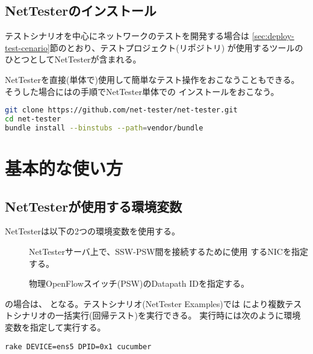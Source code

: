   \subsection{NetTesterのインストール}

テストシナリオを中心にネットワークのテストを開発する場合は
\ref{sec:deploy-test-cenario}節のとおり、テストプロジェクト(リポジトリ)
が使用するツールのひとつとしてNetTesterが含まれる。

NetTesterを直接(単体で)使用して簡単なテスト操作をおこなうこともできる。
そうした場合にはの手順でNetTester単体での
インストールをおこなう。

\begin{lstlisting}[language=sh,caption=NetTesterのインストール,label=lst:install-nettester]
git clone https://github.com/net-tester/net-tester.git
cd net-tester
bundle install --binstubs --path=vendor/bundle
\end{lstlisting}

 \section{基本的な使い方}
 \label{sec:basic-usage}

  \subsection{NetTesterが使用する環境変数}
  \label{sec:nettester-envvar}

NetTesterは以下の2つの環境変数を使用する。
\begin{description}
 \item[] NetTesterサーバ上で、SSW-PSW間を接続するために使用
            するNICを指定する。
 \item[] 物理OpenFlowスイッチ(PSW)のDatapath IDを指定する。
\end{description}

の場合は、
となる。テストシナリオ(NetTester Examples)では
により複数テストシナリオの一括実行(回帰テスト)を実行できる。
実行時には次のように環境変数を指定して実行する。
\begin{lstlisting}
rake DEVICE=ens5 DPID=0x1 cucumber
\end{lstlisting}

